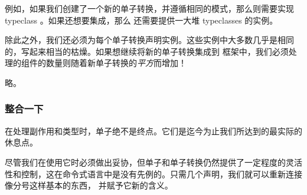 \documentclass[./main.tex]{subfiles}
\begin{document}
例如，如果我们创建了一个新的单子转换，并遵循相同的模式，那么则需要实现 typeclass 。如果还想要集成，那么
还需要提供一大堆 typeclasses 的实例。

除此之外，我们还必须为每个单子转换声明实例。这些实例中大多数几乎是相同的，写起来相当的枯燥。如果想继续将新的单子转换集成到
框架中，我们必须处理的组件的数量则随着新单子转换的\textit{平方}而增加！

略。

\subsubsection*{整合一下}

在处理副作用和类型时，单子绝不是终点。它们是迄今为止我们所达到的最实际的休息点。

尽管我们在使用它时必须做出妥协，但单子和单子转换仍然提供了一定程度的灵活性和控制，这在命令式语言中是没有先例的。只需几个声明，我们就可以重新连接像分号这样基本的东西，
并赋予它新的含义。
\end{document}
